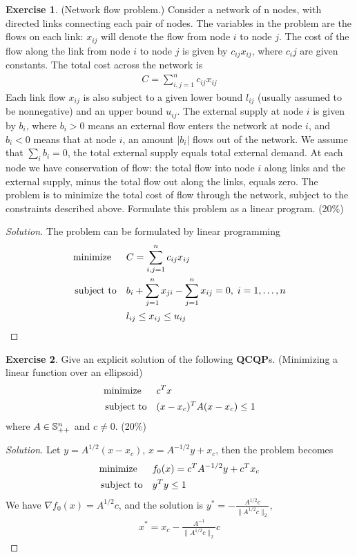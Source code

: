\documentclass[12pt]{extarticle}
\theoremstyle{definition}
\newtheorem{exercise}{Exercise}
\begin{document}
\begin{exercise}
  (Network flow problem.) Consider a network of n nodes, with directed links connecting each pair of nodes.
  The variables in the problem are the flows on each link: $x_{ij}$ will denote the flow from node $i$ to node $j$.
  The cost of the flow along the link from node $i$ to node $j$ is given by $c_{ij}x_{ij}$, where $c_ij$ are given constants.
  The total cost across the network is
  \begin{align*}
    C=\sum_{i,j=1}^nc_{ij}x_{ij}
  \end{align*}
  Each link flow $x_{ij}$ is also subject to a given lower bound $l_{ij}$ (usually assumed to be nonnegative) and an upper bound $u_{ij}$.
  The external supply at node $i$ is given by $b_i$, where $b_i>0$ means an external flow enters the network at node $i$, and $b_i<0$ means that at node $i$, an amount $|b_i|$ flows out of the network.
  We assume that $\sum_{i}b_i=0$, \ie the total external supply equals total external demand.
  At each node we have conservation of flow: the total flow into node $i$ along links and the external supply, minus the total flow out along the links, equals zero.
  The problem is to minimize the total cost of flow through the network, subject to the constraints described above.
  Formulate this problem as a linear program. (20\%)
\end{exercise}
\begin{proof}[Solution]
  \let\qed\relax
  The problem can be formulated by linear programming
  \begin{align*}
    \text{minimize\;\;}\quad& C=\sum_{i,j=1}^nc_{ij}x_{ij}\\
    \text{subject to}  \quad& b_i+\sum_{j=1}^nx_{ji}-\sum_{j=1}^nx_{ij}=0,\;i=1,\dots,n\\
                            & l_{ij}\le x_{ij}\le u_{ij}
  \end{align*}
\end{proof}

\begin{exercise}
  Give an explicit solution of the following \textbf{QCQP}s. (Minimizing a linear function over an ellipsoid)
  \begin{align*}
    \text{minimize\;\;}\quad& c^Tx\\
    \text{subject to}  \quad& (x-x_c)^TA(x-x_c)\le 1
  \end{align*}
  where $A\in\mathbb{S}_{++}^n$ and $c\neq 0$. (20\%)
\end{exercise}
\begin{proof}[Solution]
  \let\qed\relax
  Let $y=A^{1/2}(x-x_c)$, \ie $x=A^{-1/2}y+x_c$, then the problem becomes
  \begin{align*}
    \text{minimize\;\;}\quad& f_0(x)=c^TA^{-1/2}y+c^Tx_c\\
    \text{subject to}  \quad& y^Ty\le 1
  \end{align*}
  We have $\nabla f_0(x)=A^{1/2}c$, and the solution is $y^\ast=-\frac{A^{1/2}c}{\|A^{1/2}c\|_2}$, \ie
  \begin{align*}
    x^\ast=x_c-\frac{A^{-1}}{\|A^{1/2}c\|_2}c
  \end{align*}
\end{proof}
\end{document}
